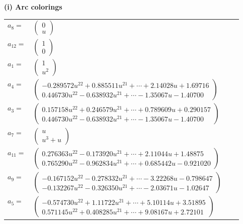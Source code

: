 \documentclass[1p]{elsarticle_modified}
\theoremstyle{definition}
\begin{document}
\flushleft \textbf{(i) Arc colorings}\\
\begin{tabular}{m{7pt} m{180pt} m{7pt} m{180pt} }
\flushright $a_{8}=$&$\begin{pmatrix}0\\u\end{pmatrix}$ \\
\flushright $a_{12}=$&$\begin{pmatrix}1\\0\end{pmatrix}$ \\
\flushright $a_{1}=$&$\begin{pmatrix}1\\u^2\end{pmatrix}$ \\
\flushright $a_{4}=$&$\begin{pmatrix}-0.289572 u^{22}+0.885511 u^{21}+\cdots+2.14028 u+1.69716\\0.446730 u^{22}-0.638932 u^{21}+\cdots-1.35067 u-1.40700\end{pmatrix}$ \\
\flushright $a_{3}=$&$\begin{pmatrix}0.157158 u^{22}+0.246579 u^{21}+\cdots+0.789609 u+0.290157\\0.446730 u^{22}-0.638932 u^{21}+\cdots-1.35067 u-1.40700\end{pmatrix}$ \\
\flushright $a_{7}=$&$\begin{pmatrix}u\\u^3+u\end{pmatrix}$ \\
\flushright $a_{11}=$&$\begin{pmatrix}0.276363 u^{22}-0.173920 u^{21}+\cdots+2.11044 u+1.48875\\0.765290 u^{22}-0.962834 u^{21}+\cdots+0.685442 u-0.921020\end{pmatrix}$ \\
\flushright $a_{9}=$&$\begin{pmatrix}-0.167152 u^{22}-0.278332 u^{21}+\cdots-3.22268 u-0.798647\\-0.132267 u^{22}-0.326350 u^{21}+\cdots-2.03671 u-1.02647\end{pmatrix}$ \\
\flushright $a_{5}=$&$\begin{pmatrix}-0.574730 u^{22}+1.11722 u^{21}+\cdots+5.10114 u+3.51895\\0.571145 u^{22}+0.408285 u^{21}+\cdots+9.08167 u+2.72101\end{pmatrix}$ \\

\end{tabular}
\end{document}

